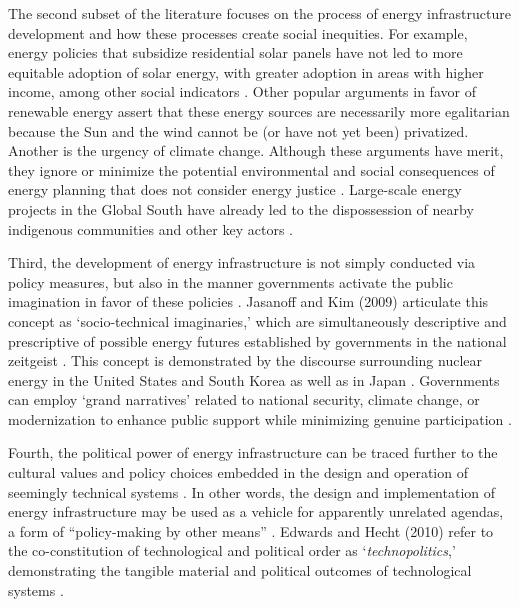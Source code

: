 The second subset of the literature focuses on the process of energy
infrastructure development and how these processes create social inequities. For
example, energy policies that subsidize residential solar panels have not led to
more equitable adoption of solar energy, with greater adoption in areas with
higher income, among other social indicators \cite{reames_distributional_2020}.
Other popular arguments in favor of renewable energy assert that these energy
sources are necessarily more egalitarian because the Sun and the wind cannot be
(or have not yet been) privatized. Another is the urgency of climate change.
Although these arguments have merit, they ignore or minimize the potential environmental and social
consequences of energy planning that does not consider energy justice
\cite{jones_building_2013}. Large-scale energy projects in the Global South have
already led to the dispossession of nearby indigenous communities and other key
actors \cite{yenneti_spatial_2016, barragan-contreras_procedural_2022}.

Third, the development of energy infrastructure is not simply conducted via
policy measures, but also in the manner governments activate the public
imagination in favor of these policies
\cite{bridge_energy_2018,jasanoff_containing_2009}. Jasanoff and Kim (2009)
articulate this concept as `socio-technical imaginaries,' which are
simultaneously descriptive and prescriptive of possible energy futures
established by governments in the national zeitgeist
\cite{jasanoff_containing_2009}. This concept is demonstrated by the discourse
surrounding nuclear energy in the United States and South Korea
\cite{jasanoff_containing_2009} as well as in Japan
\cite{valentine_energy_2019}. Governments can employ `grand narratives' related
to national security, climate change, or modernization to enhance public support
while minimizing genuine participation \cite{bridge_energy_2018}.

Fourth, the political power of energy infrastructure can be traced further to
the cultural values and policy choices embedded in the design and operation of
seemingly technical systems \cite{bridge_energy_2018}. In other words, the
design and implementation of energy infrastructure may be used as a vehicle for
apparently unrelated agendas, a form of ``policy-making by other means''
\cite{bridge_energy_2018, clausewitz_chapter_1918}. Edwards and Hecht (2010)
refer to the co-constitution of technological and political order as
`\textit{technopolitics},' demonstrating the tangible material and political
outcomes of technological systems \cite{edwards_history_2010}.


